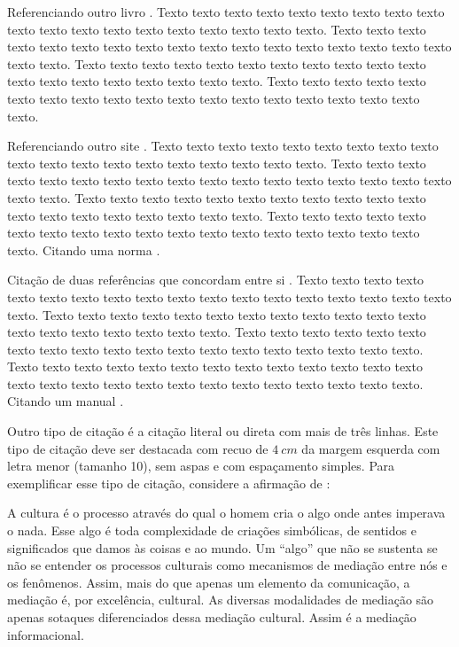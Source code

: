     Referenciando outro livro \cite{LangtangenLogg2017}. Texto texto texto texto texto texto texto texto texto texto texto texto texto texto texto texto texto texto texto. Texto texto texto texto texto texto texto texto texto texto texto texto texto texto texto texto texto texto texto. Texto texto texto texto texto texto texto texto texto texto texto texto texto texto texto texto texto texto texto. Texto texto texto texto texto texto texto texto texto texto texto texto texto texto texto texto texto texto texto.

    Referenciando outro site \cite{secretaria1999}. Texto texto texto texto texto texto texto texto texto texto texto texto texto texto texto texto texto texto texto. Texto texto texto texto texto texto texto texto texto texto texto texto texto texto texto texto texto texto texto. Texto texto texto texto texto texto texto texto texto texto texto texto texto texto texto texto texto texto texto. Texto texto texto texto texto texto texto texto texto texto texto texto texto texto texto texto texto texto texto. Citando uma norma \cite{NBR10520:2002}.
        
    Citação de duas referências que concordam entre si \cite{Almeida2018,Gondim2017}. Texto texto texto texto texto texto texto texto texto texto texto texto texto texto texto texto texto texto texto. Texto texto texto texto texto texto texto texto texto texto texto texto texto texto texto texto texto texto texto. Texto texto texto texto texto texto texto texto texto texto texto texto texto texto texto texto texto texto texto. Texto texto texto texto texto texto texto texto texto texto texto texto texto texto texto texto texto texto texto texto texto texto texto texto texto texto. Citando um manual \cite{manuais1989}. 
        
    Outro tipo de citação é a citação literal ou direta com mais de três linhas. Este tipo de citação deve ser destacada com recuo de $4~cm$ da margem esquerda com letra menor (tamanho 10), sem aspas e com espaçamento simples.  Para exemplificar esse tipo de citação, considere a afirmação de :
    \begin{citacao}
        A cultura é o processo através do qual o homem cria o algo onde antes imperava o nada. Esse algo é toda complexidade de criações simbólicas, de sentidos e significados que damos às coisas e ao mundo. Um ``algo'' que não se sustenta se não se entender os processos culturais como mecanismos de mediação entre nós e os fenômenos. Assim, mais do que apenas um elemento da comunicação, a mediação é, por excelência, cultural. As diversas modalidades de mediação são apenas sotaques diferenciados dessa mediação cultural. Assim é a mediação informacional.
    \end{citacao}
        
